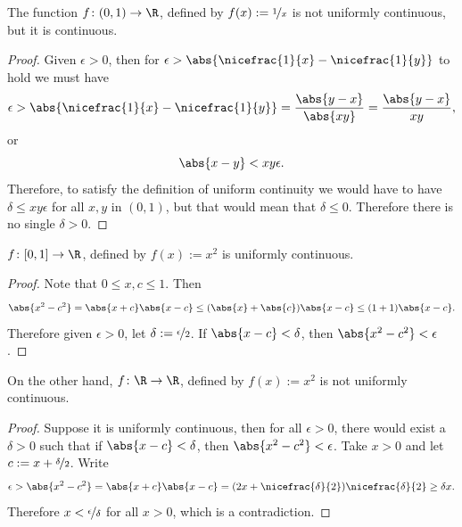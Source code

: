 \documentclass[12pt]{book}
\begin{document}
\begin{example}
The function $f \colon (0,1) \to \R$, defined by $f(x) := \nicefrac{1}{x}$ is not
uniformly continuous, but it is continuous.

\begin{proof} Given $\epsilon > 0$, then for $\epsilon >
\abs{\nicefrac{1}{x}-\nicefrac{1}{y}}$ to hold we must have
\begin{equation*}
\epsilon >
\abs{\nicefrac{1}{x}-\nicefrac{1}{y}}
=
\frac{\abs{y-x}}{\abs{xy}} 
=
\frac{\abs{y-x}}{xy} ,
\end{equation*}
or
\begin{equation*}
\abs{x-y} < xy \epsilon .
\end{equation*}
Therefore, to satisfy the definition of uniform continuity we would have to
have $\delta \leq xy \epsilon$ for all $x,y$ in $(0,1)$, but that would mean
that $\delta \leq 0$.
Therefore there is no single $\delta > 0$.
\end{proof}
\end{example}

\begin{example}
$f \colon [0,1] \to \R$, defined by $f(x) := x^2$ is uniformly continuous.

\begin{proof} Note that $0 \leq x,c \leq 1$.
Then
\begin{equation*}
\abs{x^2-c^2} = \abs{x+c}\abs{x-c}
\leq (\abs{x}+\abs{c}) \abs{x-c}
\leq (1+1)\abs{x-c} .
\end{equation*}
Therefore given $\epsilon > 0$, let $\delta := \nicefrac{\epsilon}{2}$.
If $\abs{x-c} < \delta$, then $\abs{x^2-c^2} < \epsilon$.
\end{proof}

On the other hand, $f \colon \R \to \R$, defined by $f(x) := x^2$ is not uniformly
continuous.

\begin{proof} Suppose it is uniformly continuous, then for all $\epsilon > 0$,
there would exist a $\delta > 0$ such that
if $\abs{x-c} < \delta$, then $\abs{x^2 -c^2} < \epsilon$.
Take $x > 0$ and let
$c := x+\nicefrac{\delta}{2}$.
Write
\begin{equation*}
\epsilon >
\abs{x^2-c^2} = \abs{x+c}\abs{x-c}
=
(2x+\nicefrac{\delta}{2})\nicefrac{\delta}{2} 
\geq 
\delta x .
\end{equation*}
Therefore $x < \nicefrac{\epsilon}{\delta}$ for all $x > 0$, which is a
contradiction.
\end{proof}
\end{example}
\end{document}
